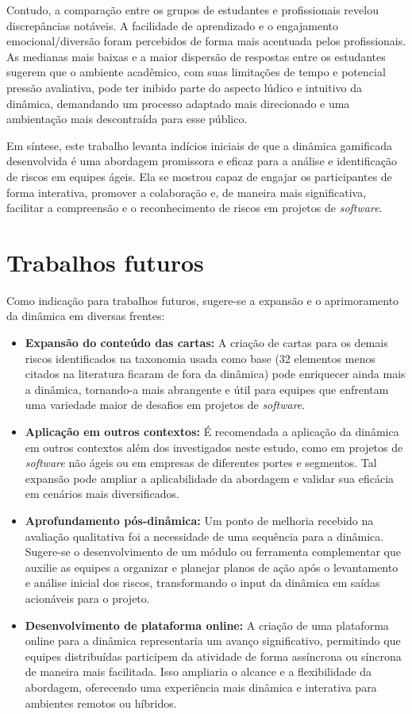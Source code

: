 \documentclass[
	12pt,
	openright,
	twoside,
	a4paper,
	english,
	brazil
	]{abntex2}
\begin{document}
Contudo, a comparação entre os grupos de estudantes e profissionais revelou discrepâncias notáveis. A facilidade de aprendizado e o engajamento emocional/diversão foram percebidos de forma mais acentuada pelos profissionais. As medianas mais baixas e a maior dispersão de respostas entre os estudantes sugerem que o ambiente acadêmico, com suas limitações de tempo e potencial pressão avaliativa, pode ter inibido parte do aspecto lúdico e intuitivo da dinâmica, demandando um processo adaptado mais direcionado e uma ambientação mais descontraída para esse público.

Em síntese, este trabalho levanta indícios iniciais de que a dinâmica gamificada desenvolvida é uma abordagem promissora e eficaz para a análise e identificação de riscos em equipes ágeis. Ela se mostrou capaz de engajar os participantes de forma interativa, promover a colaboração e, de maneira mais significativa, facilitar a compreensão e o reconhecimento de riscos em projetos de \textit{software}.

\section{Trabalhos futuros}
\label{sec:trabalhos-futuros}

Como indicação para trabalhos futuros, sugere-se a expansão e o aprimoramento da dinâmica em diversas frentes:

\begin{itemize}
\item \textbf{Expansão do conteúdo das cartas:} A criação de cartas para os demais riscos identificados na taxonomia usada como base \cite{carr_1993} (32 elementos menos citados na literatura ficaram de fora da dinâmica) pode enriquecer ainda mais a dinâmica, tornando-a mais abrangente e útil para equipes que enfrentam uma variedade maior de desafios em projetos de \textit{software}.
\item \textbf{Aplicação em outros contextos:} É recomendada a aplicação da dinâmica em outros contextos além dos investigados neste estudo, como em projetos de \textit{software} não ágeis ou em empresas de diferentes portes e segmentos. Tal expansão pode ampliar a aplicabilidade da abordagem e validar sua eficácia em cenários mais diversificados.
\item \textbf{Aprofundamento pós-dinâmica:} Um ponto de melhoria recebido na avaliação qualitativa foi a necessidade de uma sequência para a dinâmica. Sugere-se o desenvolvimento de um módulo ou ferramenta complementar que auxilie as equipes a organizar e planejar planos de ação após o levantamento e análise inicial dos riscos, transformando o input da dinâmica em saídas acionáveis para o projeto.
\item \textbf{Desenvolvimento de plataforma online:} A criação de uma plataforma online para a dinâmica representaria um avanço significativo, permitindo que equipes distribuídas participem da atividade de forma assíncrona ou síncrona de maneira mais facilitada. Isso ampliaria o alcance e a flexibilidade da abordagem, oferecendo uma experiência mais dinâmica e interativa para ambientes remotos ou híbridos.
\end{itemize}
\end{document}
